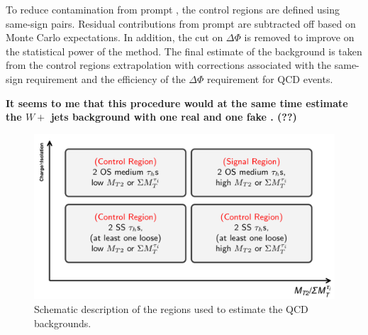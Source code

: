 To reduce contamination from prompt \tauTau, the control regions are
defined using same-sign pairs.  Residual contributions from prompt
\tauTau are subtracted off based on Monte Carlo expectations.
In addition, the cut on $\Delta \Phi$
is removed to improve on the statistical power of the method. 
The final estimate of the background
is taken from the control regions extrapolation with corrections
associated with the same-sign requirement and the efficiency of 
the $\Delta \Phi$ requirement for QCD events.



{\bf It seems to me that this procedure would at the same time estimate 
the $W+$ jets background with one real \Tau and one fake \Tau. (??)}


\begin{figure}[!Hhtb]
\centering
\includegraphics[angle=0,scale=0.30]{Bkg/ABCD.png}
\caption{Schematic description of the regions used to estimate the QCD backgrounds.}
\label{fig:ABCDQCD}
\end{figure}

